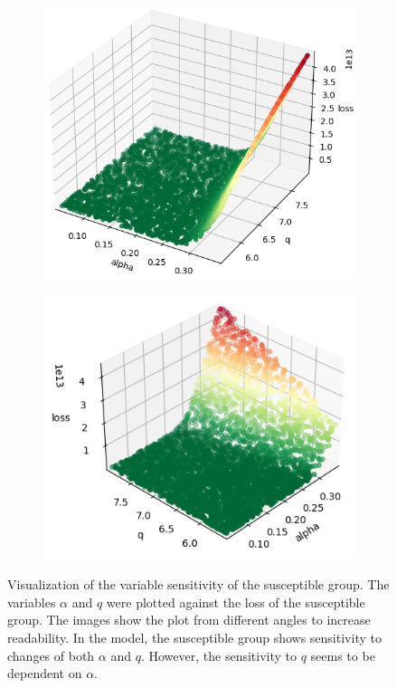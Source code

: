 \begin{figure}
	\centering
	\begin{subfigure}[b]{0.4\textwidth}
		\centering
		\includegraphics[width=\textwidth]{./figures/sensitivity/sensitivity_zoom0_0_2.png}	
	\end{subfigure}
	\begin{subfigure}[b]{0.4\textwidth}
		\centering
		\includegraphics[width=\textwidth]{./figures/sensitivity/sensitivity_zoom0_1_2.png}	
	\end{subfigure}
	\caption[Sensitivity analysis for $\alpha$ and $q$, full]{Visualization of the variable sensitivity of the susceptible group. The variables $\alpha$ and $q$ were plotted
		against the loss of the susceptible group.
		The images show the plot from different angles to increase readability.
		In the model, the susceptible group shows sensitivity to changes of both $\alpha$ and
		$q$. However, the sensitivity to $q$ seems to be dependent on $\alpha$.
		}
	\label{fig:sensitivity_zoom0}
\end{figure}

